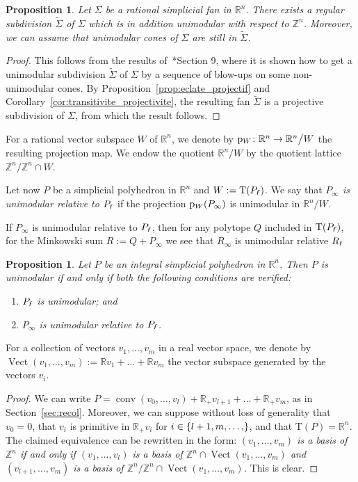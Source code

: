 \documentclass[11pt]{amsart}
\newtheorem{prop}[thm]{Proposition}
\theoremstyle{definition}
\newenvironment{remark}
  {\pushQED{\qed}\renewcommand{\qedsymbol}{$\diamond$}\remm}
  {\popQED\endremm}
\numberwithin{equation}{section}
\renewcommand{\~}{\widetilde}
\newcommand{\Z}{\mathbb{Z}}
\newcommand{\R}{\mathbb{R}}
\newcommand{\zint}[2]{\{#1,\dots,#2\}}
\newcommand{\rquot}[2]{#1\big/#2}
\DeclareMathOperator{\Vect}{Vect} %
\newcommand{\f}{{\textnormal{\textsl{\textsf f}}}} %
\newcommand{\TT}{\mathrm{T}} %
\newcommand{\p}{{\rm p}} %
\DeclareMathOperator{\conv}{conv} %
\begin{document}
\begin{prop} \label{prop:subdivision_unimodulaire_projective}
Let $\Sigma$ be a rational simplicial fan in $\R^n$. There exists a regular subdivision $\~\Sigma$ of $\Sigma$ which is in addition unimodular with respect to $\Z^n$. Moreover, we can assume that unimodular cones of $\Sigma$ are still in $\~\Sigma$.
\end{prop}

\begin{proof}
This follows from the results of~\cite{Wlo97}*{Section 9}, where it is shown how to get a unimodular subdivision $\~\Sigma$ of $\Sigma$ by a sequence of blow-ups on some non-unimodular cones. By Proposition~\ref{prop:eclate_projectif} and Corollary~\ref{cor:transitivite_projectivite}, the resulting fan $\~\Sigma$ is a projective subdivision of $\Sigma$, from which the result follows.
\end{proof}

For a rational vector subspace $W$ of $\R^n$, we denote by $\p_W\colon\R^n\to\rquot{\R^n}{W}$ the resulting projection map. We endow the quotient $\rquot{\R^n}W$ by the quotient lattice $\rquot{\Z^n}{\Z^n\cap W}$.

\medskip

Let now $P$ be a simplicial polyhedron in $\R^n$ and $W:=\TT(P_\f)$. We say that \emph{$P_\infty$ is unimodular relative to $P_\f$} if the projection $\p_W(P_\infty)$ is unimodular in $\rquot{\R^n}{W}$.

\begin{remark} \label{rem:modulaire_subdivision}
If $P_\infty$ is unimodular relative to $P_\f$, then for any polytope $Q$ included in $\TT(P_\f)$, for the Minkowski sum $R:=Q+P_\infty$ we see that $R_\infty$ is unimodular relative $R_\f$
\end{remark}

\begin{prop} \label{prop:decomposition_unimodularite}
Let $P$ be an integral simplicial polyhedron in $\R^n$. Then $P$ is unimodular if and only if both the following conditions are verified:
\begin{enumerate}
\item $P_\f$ is unimodular; and
\item $P_\infty$ is unimodular relative to $P_\f$.
\end{enumerate}
\end{prop}

For a collection of vectors $v_1, \dots, v_m$ in a real vector space, we denote by $\Vect(v_1, \dots, v_m) := \R v_1+ \dots +\R v_m$ the vector subspace generated by the vectors $v_i$.
\begin{proof}
We can write $P=\conv(v_0,\dots,v_l)+\R_+v_{l+1}+\dots+\R_+v_m$, as in Section~\ref{sec:recol}. Moreover, we can suppose without loss of generality that $v_0=0$, that $v_i$ is primitive in $\R_+v_i$ for $i\in\zint{l+1,m}$, and that $\TT(P)=\R^n$. The claimed equivalence can be rewritten in the form: \emph{$(v_1,\dots,v_m)$ is a basis of $\Z^n$ if and only if $(v_1,\dots,v_l)$ is a basis of $\Z^n\cap\Vect(v_1,\dots,v_m)$ and $(v_{l+1},\dots,v_m)$ is a basis of $\rquot{\Z^n}{\Z^n\cap\Vect(v_1,\dots,v_m)}$.} This is clear.
\end{proof}
\end{document}
